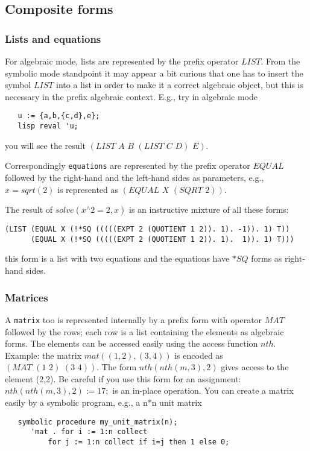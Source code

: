 \documentclass[11pt]{article}
\makeatletter
\newcommand{\ttindex}[1]{\index{#1@{\texttt{#1}}}}
\makeatother
\begin{document}
\subsection{Composite forms}

\subsubsection{Lists and equations}

For algebraic mode, lists are represented by the prefix
operator $LIST$. From the symbolic mode standpoint it may
appear a bit curious that one has to insert
the symbol $LIST$ into a list in order to make it
a correct algebraic object, but this is necessary
in the prefix algebraic context.
E.g., try in algebraic mode

\begin{verbatim}
   u := {a,b,{c,d},e};
   lisp reval 'u;
\end{verbatim}
you will see the result $(LIST\,\, A\,\, B\,\, (LIST\,\, C\,\, D)\,\, E)$.

Correspondingly \texttt{equations} are represented by
the prefix operator $EQUAL$ followed by the right-hand and
the left-hand sides as parameters, e.g., $x=sqrt(2)$
is represented as $(EQUAL\,\, X\,\,(SQRT\,\, 2))$.

The result of $solve(x^\wedge2 = 2, x)$ is an instructive
mixture of all these forms:
\begin{verbatim}
(LIST (EQUAL X (!*SQ (((((EXPT 2 (QUOTIENT 1 2)). 1). -1)). 1) T))
      (EQUAL X (!*SQ (((((EXPT 2 (QUOTIENT 1 2)). 1).  1)). 1) T)))
\end{verbatim}
this form is a list with two equations and the equations
have $*SQ$ forms as right-hand sides.

\subsubsection{Matrices}

A \texttt{matrix}\ttindex{matrix} too is represented internally by
a prefix form with operator $MAT$ followed by the rows;
each row is a list containing the elements as algebraic
forms. The elements can be accessed easily using the
access function $nth$. Example: the matrix $mat((1,2),(3,4))$
is encoded as $(MAT\,\,(1\,\, 2)\,\, (3\,\, 4))$.
The form $nth(nth(m,3),2)$ gives access to the element (2,2).
Be careful if you use this form for an assignment:
$nth(nth(m,3),2):=17;$ is an in-place operation.
You can create a matrix easily by a symbolic program, e.g.,
a n*n unit matrix
\begin{verbatim}
   symbolic procedure my_unit_matrix(n);
      'mat . for i := 1:n collect
          for j := 1:n collect if i=j then 1 else 0;
\end{verbatim}
\end{document}
